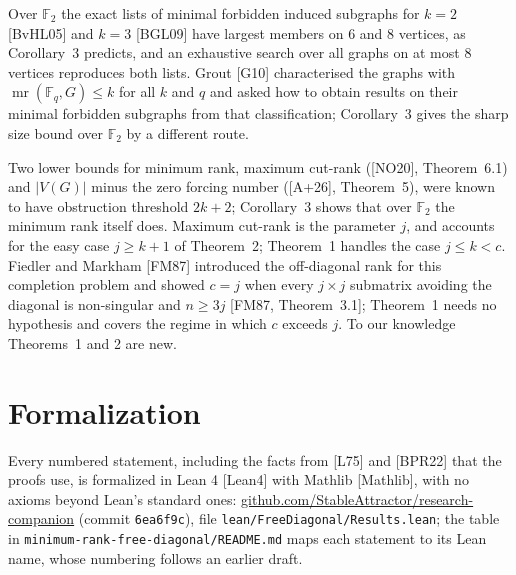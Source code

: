 \documentclass[11pt,letterpaper,reqno]{amsart}
\theoremstyle{spaced}
\begin{document}
Over \(\mathbb{F}_2\) the exact lists of minimal forbidden induced subgraphs for \(k = 2\) {[}BvHL05{]} and \(k = 3\) {[}BGL09{]} have largest members on 6 and 8 vertices, as Corollary~3 predicts, and an exhaustive search over all graphs on at most 8 vertices reproduces both lists. Grout {[}G10{]} characterised the graphs with \(\operatorname{mr}(\mathbb{F}_q, G) \le k\) for all \(k\) and \(q\) and asked how to obtain results on their minimal forbidden subgraphs from that classification; Corollary~3 gives the sharp size bound over \(\mathbb{F}_2\) by a different route.

Two lower bounds for minimum rank, maximum cut-rank ({[}NO20{]}, Theorem~6.1) and \(\lvert V(G)\rvert\) minus the zero forcing number ({[}A+26{]}, Theorem~5), were known to have obstruction threshold \(2k+2\); Corollary~3 shows that over \(\mathbb{F}_2\) the minimum rank itself does. Maximum cut-rank is the parameter \(j\), and accounts for the easy case \(j \ge k+1\) of Theorem~2; Theorem~1 handles the case \(j \le k < c\). Fiedler and Markham {[}FM87{]} introduced the off-diagonal rank for this completion problem and showed \(c = j\) when every \(j \times j\) submatrix avoiding the diagonal is non-singular and \(n \ge 3j\) {[}FM87, Theorem~3.1{]}; Theorem~1 needs no hypothesis and covers the regime in which \(c\) exceeds \(j\). To our knowledge Theorems~1 and 2 are new.

\hypertarget{formalization}{%
\section{Formalization}\label{formalization}}

Every numbered statement, including the facts from {[}L75{]} and {[}BPR22{]} that the proofs use, is formalized in Lean 4 {[}Lean4{]} with Mathlib {[}Mathlib{]}, with no axioms beyond Lean's standard ones: \href{https://github.com/StableAttractor/research-companion/tree/6ea6f9c5e396a67cb100720ea44652ff521a2db8}{github.com/\allowbreak{}StableAttractor/\allowbreak{}\mbox{research-companion}} (commit \texttt{6ea6f9c}), file \texttt{lean/\allowbreak{}FreeDiagonal/\allowbreak{}Results.lean}; the table in \texttt{minimum-rank-free-diagonal/\allowbreak{}README.md} maps each statement to its Lean name, whose numbering follows an earlier draft.
\end{document}

